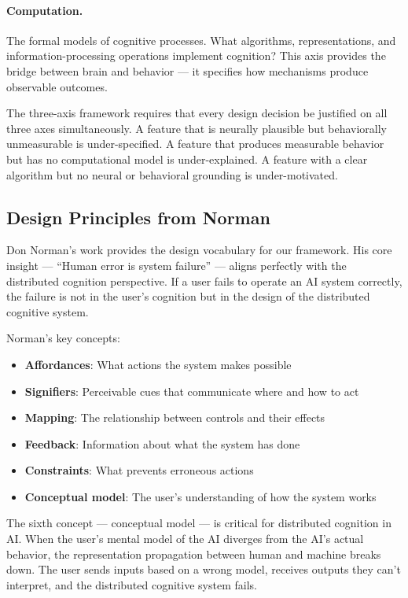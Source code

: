 \documentclass[11pt,a4paper]{article}
\begin{document}
\paragraph{Computation.} The formal models of cognitive processes. What algorithms, representations, and information-processing operations implement cognition? This axis provides the bridge between brain and behavior --- it specifies how mechanisms produce observable outcomes.

The three-axis framework requires that every design decision be justified on all three axes simultaneously. A feature that is neurally plausible but behaviorally unmeasurable is under-specified. A feature that produces measurable behavior but has no computational model is under-explained. A feature with a clear algorithm but no neural or behavioral grounding is under-motivated.

\subsection{Design Principles from Norman}

Don Norman's work \citep{norman1988,norman2013} provides the design vocabulary for our framework. His core insight --- ``Human error is system failure'' --- aligns perfectly with the distributed cognition perspective. If a user fails to operate an AI system correctly, the failure is not in the user's cognition but in the design of the distributed cognitive system.

Norman's key concepts:
\begin{itemize}[leftmargin=*, itemsep=2pt]
  \item \textbf{Affordances}: What actions the system makes possible \citep{gibson1979,norman1988}
  \item \textbf{Signifiers}: Perceivable cues that communicate where and how to act
  \item \textbf{Mapping}: The relationship between controls and their effects
  \item \textbf{Feedback}: Information about what the system has done
  \item \textbf{Constraints}: What prevents erroneous actions
  \item \textbf{Conceptual model}: The user's understanding of how the system works
\end{itemize}

The sixth concept --- conceptual model --- is critical for distributed cognition in AI. When the user's mental model of the AI diverges from the AI's actual behavior, the representation propagation between human and machine breaks down. The user sends inputs based on a wrong model, receives outputs they can't interpret, and the distributed cognitive system fails.
\end{document}
